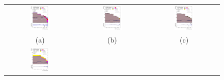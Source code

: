 \begin{figure}[H]
\begin{tabular}{@{}ccc@{}}
\includegraphics[width=0.29\textwidth]{figures/tuH_reg1l2tau1bnj_os.pdf}&
\includegraphics[width=0.29\textwidth]{figures/tuH_reg1l1tau1b1j_ss.pdf}&
\includegraphics[width=0.29\textwidth]{figures/tuH_reg1l1tau1b2j_ss.pdf}\\
(a)  & (b) & (c) \\
\includegraphics[width=0.29\textwidth]{figures/tuH_reg1l1tau1b2j_os.pdf}&

\end{tabular}
\end{figure}
